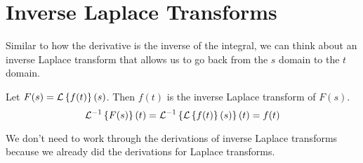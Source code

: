 \section{Inverse Laplace Transforms}
\noindent
Similar to how the derivative is the inverse of the integral, we can think about an inverse Laplace transform that allows us to go back from the $s$ domain to the $t$ domain.
\begin{definition}
	Let $F(s) = \mathcal{L}\left\{ f(t) \right\}\left(s\right)$. Then $f(t)$ is the inverse Laplace transform of $F(s)$.
	\begin{equation*}
		\mathcal{L}^{-1}\left\{ F(s) \right\}\left(t\right) = \mathcal{L}^{-1}\left\{ \mathcal{L}\left\{ f(t) \right\}\left(s\right) \right\}\left(t\right) = f(t)
	\end{equation*}
\end{definition}

\noindent
We don't need to work through the derivations of inverse Laplace transforms because we already did the derivations for Laplace transforms.